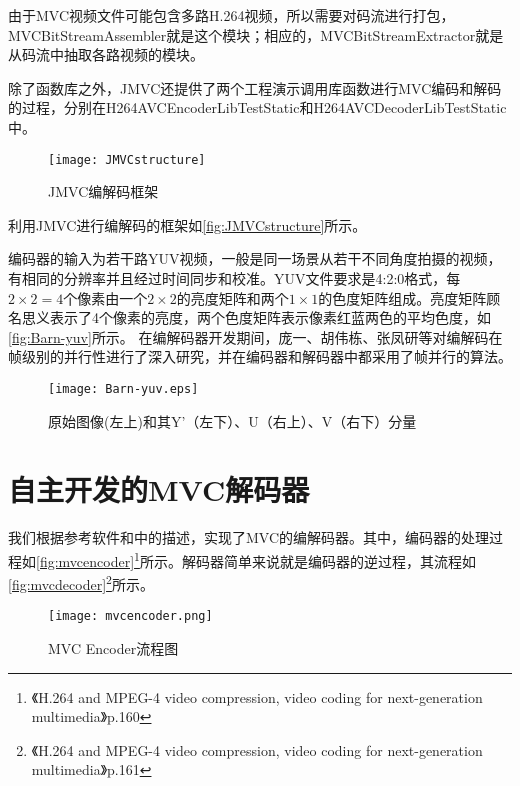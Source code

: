 由于MVC视频文件可能包含多路H.264视频，所以需要对码流进行打包，MVCBitStreamAssembler就是这个模块；相应的，MVCBitStreamExtractor就是从码流中抽取各路视频的模块。

除了函数库之外，JMVC还提供了两个工程演示调用库函数进行MVC编码和解码的过程，分别在H264AVCEncoderLibTestStatic和H264AVCDecoderLibTestStatic中。

\begin{figure}[htbp]
\begin{center}
\texttt{[image: JMVCstructure]}
\caption{JMVC编解码框架}
\label{fig:JMVCstructure}
\end{center}
\end{figure}

利用JMVC进行编解码的框架如\autoref{fig:JMVCstructure}所示。

编码器的输入为若干路YUV视频，一般是同一场景从若干不同角度拍摄的视频，有相同的分辨率并且经过时间同步和校准。YUV文件要求是4:2:0格式，每$2\times2=4$个像素由一个$2\times2$的亮度矩阵和两个$1\times1$的色度矩阵组成。亮度矩阵顾名思义表示了4个像素的亮度，两个色度矩阵表示像素红蓝两色的平均色度，如\autoref{fig:Barn-yuv}所示。
在编解码器开发期间，庞一、胡伟栋、张凤研等对编解码在帧级别的并行性进行了深入研究\cite{pang2009adaptive,yi2008parallelized}，并在编码器和解码器中都采用了帧并行的算法。

\begin{figure}[htbp]
\begin{center}
\texttt{[image: Barn-yuv.eps]}
\caption{原始图像(左上)和其Y'（左下）、U（右上）、V（右下）分量}
\label{fig:Barn-yuv}
\end{center}
\end{figure}

\section{自主开发的MVC解码器}
\label{sec:mvcdecoder}

我们根据参考软件和中的描述，实现了MVC的编解码器。其中，编码器的处理过程如\autoref{fig:mvcencoder}\footnote{《H.264 and MPEG-4 video compression, video coding for next-generation multimedia》\cite{richardson2003h}p.160}所示。解码器简单来说就是编码器的逆过程，其流程如\autoref{fig:mvcdecoder}\footnote{《H.264 and MPEG-4 video compression, video coding for next-generation multimedia》\cite{richardson2003h}p.161}所示。

\begin{figure}[htbp]
\begin{center}
\texttt{[image: mvcencoder.png]}
\caption{MVC Encoder流程图}
\label{fig:mvcencoder}
\end{center}
\end{figure}

